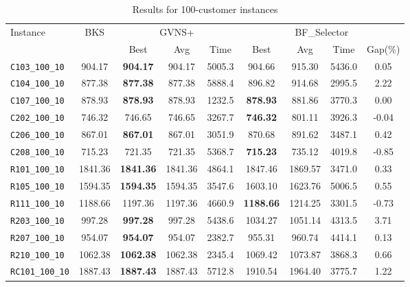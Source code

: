 \begin{table}[ht]
\centering
\small
\setlength{\tabcolsep}{5pt}
\caption{Results for 100-customer instances}
\vspace{4mm}
\begin{adjustbox}{width=\textwidth}
\begin{tabular}{l c c c c @{\hspace{8pt}} c c c c @{\hspace{8pt}}}
\toprule
\multirow{2}{*}{Instance} & \multirow{2}{*}{BKS} & \multicolumn{3}{c}{GVNS+} & \multicolumn{4}{c}{BF\_Selector} \\
\cmidrule(lr){3-5} \cmidrule(lr){6-9}
 &  & Best & Avg & Time & Best & Avg & Time & Gap(\%) \\
\midrule
\texttt{C103\_100\_10} & 904.17 & \textbf{904.17} & 904.17 & 5005.3 & 904.66 & 915.30 & 5436.0 & 0.05 \\
\texttt{C104\_100\_10} & 877.38 & \textbf{877.38} & 877.38 & 5888.4 & 896.82 & 914.68 & 2995.5 & 2.22 \\
\texttt{C107\_100\_10} & 878.93 & \textbf{878.93} & 878.93 & 1232.5 & \textbf{878.93} & 881.86 & 3770.3 & 0.00 \\
\texttt{C202\_100\_10} & 746.32 & 746.65 & 746.65 & 3267.7 & \textbf{746.32} & 801.11 & 3926.3 & -0.04 \\
\texttt{C206\_100\_10} & 867.01 & \textbf{867.01} & 867.01 & 3051.9 & 870.68 & 891.62 & 3487.1 & 0.42 \\
\texttt{C208\_100\_10} & 715.23 & 721.35 & 721.35 & 5368.7 & \textbf{715.23} & 735.12 & 4019.8 & -0.85 \\
\texttt{R101\_100\_10} & 1841.36 & \textbf{1841.36} & 1841.36 & 4864.1 & 1847.46 & 1869.57 & 3471.0 & 0.33 \\
\texttt{R105\_100\_10} & 1594.35 & \textbf{1594.35} & 1594.35 & 3547.6 & 1603.10 & 1623.76 & 5006.5 & 0.55 \\
\texttt{R111\_100\_10} & 1188.66 & 1197.36 & 1197.36 & 4660.9 & \textbf{1188.66} & 1214.25 & 3301.5 & -0.73 \\
\texttt{R203\_100\_10} & 997.28 & \textbf{997.28} & 997.28 & 5438.6 & 1034.27 & 1051.14 & 4313.5 & 3.71 \\
\texttt{R207\_100\_10} & 954.07 & \textbf{954.07} & 954.07 & 2382.7 & 955.31 & 960.74 & 4414.1 & 0.13 \\
\texttt{R210\_100\_10} & 1062.38 & \textbf{1062.38} & 1062.38 & 2345.4 & 1069.42 & 1073.87 & 3868.3 & 0.66 \\
\texttt{RC101\_100\_10} & 1887.43 & \textbf{1887.43} & 1887.43 & 5712.8 & 1910.54 & 1964.40 & 3775.7 & 1.22 \\

\end{tabular}
\end{adjustbox}
\end{table}
